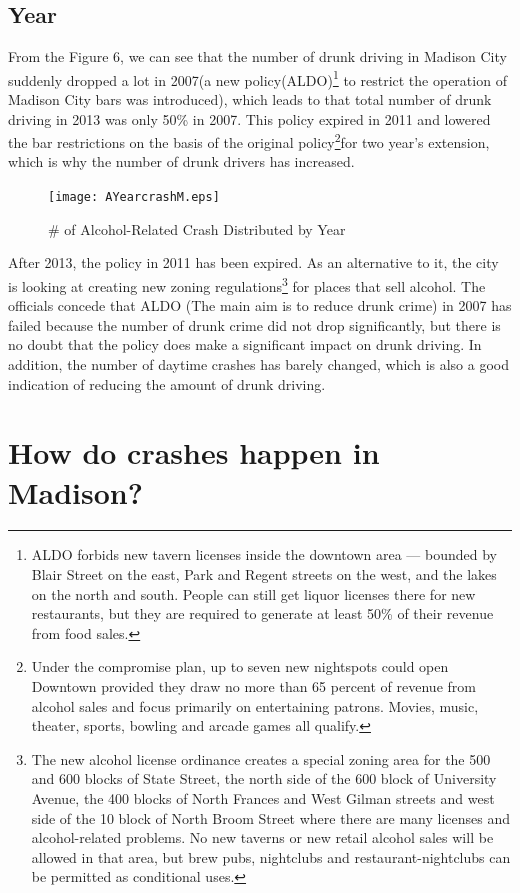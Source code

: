 \documentclass[15pt]{article}
\begin{document}
\subsection{Year}
From the Figure 6, we can see that the number of drunk driving in Madison City suddenly dropped a lot in 2007(a new policy(ALDO)\footnote{ALDO forbids new tavern licenses inside the downtown area — bounded by Blair Street on the east, Park and Regent streets on the west, and the lakes on the north and south. People can still get liquor licenses there for new restaurants, but they are required to generate at least 50\% of their revenue from food sales.} to restrict the operation of Madison City bars was introduced), which leads to that total number of drunk driving in 2013 was only 50\% in 2007. This policy expired in 2011 and lowered the bar restrictions on the basis of the original policy\footnote{Under the compromise plan, up to seven new nightspots could open Downtown provided they draw no more than 65 percent of revenue from alcohol sales and focus primarily on entertaining patrons. Movies, music, theater, sports, bowling and arcade games all qualify.}for two year's extension, which is why the number of drunk drivers has increased.
\begin{figure}[H]
\centering
\texttt{[image: AYearcrashM.eps]}
\caption{\# of Alcohol-Related Crash Distributed by Year}
\end{figure}
After 2013, the policy in 2011 has been expired. As an alternative to it, the city is looking at creating new zoning regulations\footnote{The new alcohol license ordinance creates a special zoning area for the 500 and 600 blocks of State Street, the north side of the 600 block of University Avenue, the 400 blocks of North Frances and West Gilman streets and west side of the 10 block of North Broom Street where there are many licenses and alcohol-related problems. No new taverns or new retail alcohol sales will be allowed in that area, but brew pubs, nightclubs and restaurant-nightclubs can be permitted as conditional uses.} for places that sell alcohol. The officials concede that ALDO (The main aim is to reduce drunk crime) in 2007 has failed because the number of drunk crime did not drop significantly, but there is no doubt that the policy does make a significant impact on drunk driving. In addition, the number of daytime crashes has barely changed, which is also a good indication of reducing the amount of drunk driving.

\section{How do crashes happen in Madison?}
\end{document}
